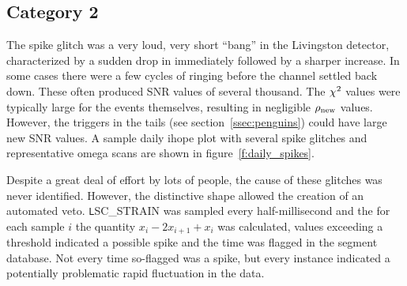 \subsection{Category 2}


The spike glitch was a very loud, very short ``bang'' in the
Livingston detector, characterized by a sudden drop in \darmerr
immediately followed by a sharper increase.  In some cases there were
a few cycles of ringing before the channel settled back down.  These
often produced SNR values of several thousand.  The $\chi^2$ values
were typically large for the events themselves, resulting in
negligible $\rho_{\textrm{new}}$ values.  However, the triggers in the tails (see
section~\ref{ssec:penguins}) could have large new SNR values.  A
sample daily ihope plot with several spike glitches and representative
omega scans are shown in figure~\ref{f:daily_spikes}.

Despite a great deal of effort by lots of people, the cause of these
glitches was never identified.  However, the distinctive shape allowed
the creation of an automated veto.  {\texttt LSC\_STRAIN} was sampled
every half-millisecond and the for each sample $i$ the quantity $x_i -
2 x_{i+1} + x_i$ was calculated, values exceeding a threshold
indicated a possible spike and the time was flagged in the segment
database.  Not every time so-flagged was a spike, but every instance
indicated a potentially problematic rapid fluctuation in the data.







